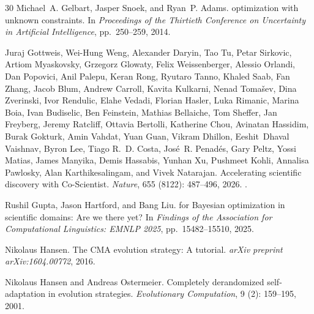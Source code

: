 \documentclass{article} %
\begin{document}
\begin{thebibliography}{30}
Michael~A. Gelbart, Jasper Snoek, and Ryan~P. Adams.
 optimization with unknown constraints.
\newblock In \emph{Proceedings of the Thirtieth Conference on Uncertainty in Artificial Intelligence}, pp.\  250--259, 2014.

Juraj Gottweis, Wei-Hung Weng, Alexander Daryin, Tao Tu, Petar Sirkovic, Artiom Myaskovsky, Grzegorz Glowaty, Felix Weissenberger, Alessio Orlandi, Dan Popovici, Anil Palepu, Keran Rong, Ryutaro Tanno, Khaled Saab, Fan Zhang, Jacob Blum, Andrew Carroll, Kavita Kulkarni, Nenad Toma{\v{s}}ev, Dina Zverinski, Ivor Rendulic, Elahe Vedadi, Florian Hasler, Luka Rimanic, Marina Boia, Ivan Budiselic, Ben Feinstein, Mathias Bellaiche, Tom Sheffer, Jan Freyberg, Jeremy Ratcliff, Ottavia Bertolli, Katherine Chou, Avinatan Hassidim, Burak Gokturk, Amin Vahdat, Yuan Guan, Vikram Dhillon, Eeshit~Dhaval Vaishnav, Byron Lee, Tiago R.~D. Costa, Jos{\'e}~R. Penad{\'e}s, Gary Peltz, Yossi Matias, James Manyika, Demis Hassabis, Yunhan Xu, Pushmeet Kohli, Annalisa Pawlosky, Alan Karthikesalingam, and Vivek Natarajan.
\newblock Accelerating scientific discovery with {Co-Scientist}.
\newblock \emph{Nature}, 655 (8122): 487--496, 2026.
\newblock {}.

Rushil Gupta, Jason Hartford, and Bang Liu.
 for {Bayesian} optimization in scientific domains: Are we there yet?
\newblock In \emph{Findings of the Association for Computational Linguistics: EMNLP 2025}, pp.\  15482--15510, 2025.

Nikolaus Hansen.
\newblock The {CMA} evolution strategy: A tutorial.
\newblock \emph{arXiv preprint arXiv:1604.00772}, 2016.

Nikolaus Hansen and Andreas Ostermeier.
\newblock Completely derandomized self-adaptation in evolution strategies.
\newblock \emph{Evolutionary Computation}, 9 (2): 159--195, 2001.


\end{thebibliography}
\end{document}
